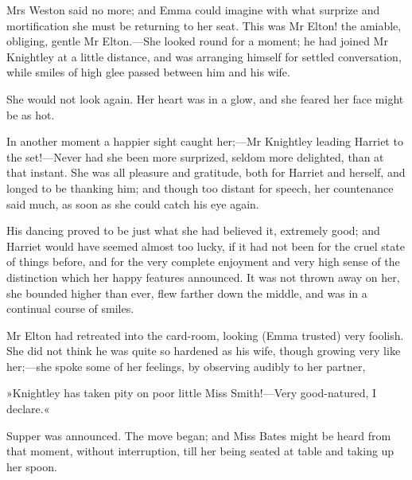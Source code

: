 Mrs Weston said no more; and Emma could imagine with what surprize and mortification she must be returning to her seat. This was Mr Elton! the amiable, obliging, gentle Mr Elton.—She looked round for a moment; he had joined Mr Knightley at a little distance, and was arranging himself for settled conversation, while smiles of high glee passed between him and his wife.

She would not look again. Her heart was in a glow, and she feared her face might be as hot.

In another moment a happier sight caught her;—Mr Knightley leading Harriet to the set!—Never had she been more surprized, seldom more delighted, than at that instant. She was all pleasure and gratitude, both for Harriet and herself, and longed to be thanking him; and though too distant for speech, her countenance said much, as soon as she could catch his eye again.

His dancing proved to be just what she had believed it, extremely good; and Harriet would have seemed almost too lucky, if it had not been for the cruel state of things before, and for the very complete enjoyment and very high sense of the distinction which her happy features announced. It was not thrown away on her, she bounded higher than ever, flew farther down the middle, and was in a continual course of smiles.

Mr Elton had retreated into the card-room, looking (Emma trusted) very foolish. She did not think he was quite so hardened as his wife, though growing very like her;—she spoke some of her feelings, by observing audibly to her partner,

»Knightley has taken pity on poor little Miss Smith!—Very good-natured, I declare.«

Supper was announced. The move began; and Miss Bates might be heard from that moment, without interruption, till her being seated at table and taking up her spoon.

